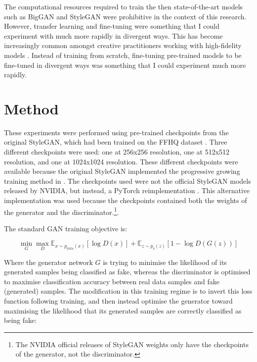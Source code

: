 The computational resources required to train the then state-of-the-art models such as BigGAN \citep{brock2018large} and StyleGAN \citep{karras2019style}  were prohibitive in the context of this research. 
However, transfer learning and fine-tuning were something that I could experiment with much more rapidly in divergent ways. 
This has become increasingly common amongst creative practitioners working with high-fidelity models \citep{berns2020bridging}. 
Instead of training from scratch, fine-tuning pre-trained models to be fine-tuned in divergent ways was something that I could experiment much more rapidly. 

\section{Method}
\label{c4:sec:method}

These experiments were performed using pre-trained checkpoints from the original StyleGAN, which had been trained on the FFHQ dataset \citep{karras2019style}. 
Three different checkpoints were used: one at 256x256 resolution, one at 512x512 resolution, and one at 1024x1024 resolution. 
These different checkpoints were available because the original StyleGAN implemented the progressive growing training method in \citep{karras2017progressive}.
The checkpoints used were not the official StyleGAN models released by NVIDIA, but instead, a PyTorch reimplementation \citep{rosinality2019style}.
This alternative implementation was used because  the checkpoints contained both the weights of the generator and the discriminator.\footnote{The NVIDIA official releases of StyleGAN weights only have the checkpoints of the generator, not the discriminator.}.

The standard GAN training objective is:

\begin{equation} 
\min_{G}\max_{D}\mathbb{E}_{x\sim p_{\text{data}}(x)}[\log{D(x)}] +  \mathbb{E}_{z\sim p_{\text{z}}(z)}[1 - \log{D(G(z))}]
\end{equation}

Where the generator network $G$ is trying to minimise the likelihood of its generated samples being classified as fake, whereas the discriminator is optimised to maximise classification accuracy between real data samples and fake (generated) samples.
The modification in this training regime is to invert this loss function following training, and then instead optimise the generator toward maximising the likelihood that its generated samples are correctly classified as being fake:

